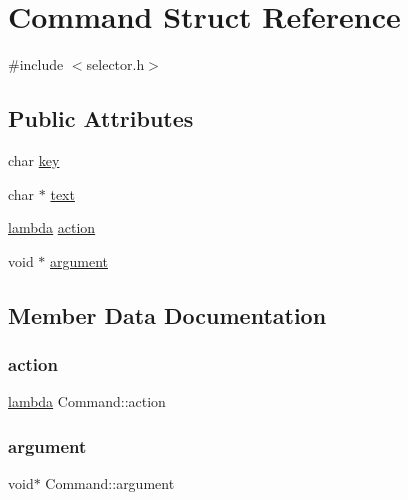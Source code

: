 \hypertarget{structCommand}{}\section{Command Struct Reference}
\label{structCommand}


{\ttfamily \#include $<$selector.\+h$>$}

\subsection*{Public Attributes}
\begin{DoxyCompactItemize}
\item 
char \hyperlink{structCommand_a1576dea54d8389ef3015c3098a0bb221}{key}
\item 
char $\ast$ \hyperlink{structCommand_a7eb229bb0f1913e0ed19bb200674b3ae}{text}
\item 
\hyperlink{selector_8h_a000f79cad05446d9e5c143a0585b377a}{lambda} \hyperlink{structCommand_a830febb9fe51bdb83e242edd914e66d8}{action}
\item 
void $\ast$ \hyperlink{structCommand_a306a5ea427fefade79d650439b535fa5}{argument}
\end{DoxyCompactItemize}


\subsection{Member Data Documentation}
\mbox{\label{structCommand_a830febb9fe51bdb83e242edd914e66d8}} 
\subsubsection{\texorpdfstring{action}{action}}
{\footnotesize\ttfamily \hyperlink{selector_8h_a000f79cad05446d9e5c143a0585b377a}{lambda} Command\+::action}

\mbox{\label{structCommand_a306a5ea427fefade79d650439b535fa5}} 
\subsubsection{\texorpdfstring{argument}{argument}}
{\footnotesize\ttfamily void$\ast$ Command\+::argument}

